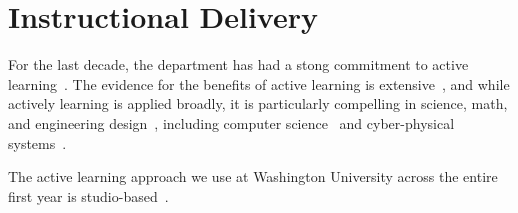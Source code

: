\section{Instructional Delivery}
\label{sec:delivery}

For the last decade, the department has had a stong commitment to
active learning~\cite{scbggg10,sgcggt10}.
The evidence for the benefits of active learning is
extensive~\cite{jjs98,lst99,Prince04,rss97},
and while actively learning is applied broadly, it is particularly
compelling in science, math, and engineering
design~\cite{Freeman14,lst99,Hake98,Byerley01,kb06}, including computer
science~\cite{McConnell96,tlb01,skltc10,ag13}
and cyber-physical systems~\cite{me14,mmy16}.

The active learning approach we use at Washington University across the entire
first year is studio-based~\cite{hnc08}.
